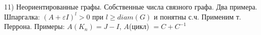 11) Неориентированные графы. Собственные числа связного графа. Два примера.\\
Шпаргалка: $(A + \varepsilon I)^l > 0$ при $l \ge diam(G)$ и понятны с.ч. Применим т. Перрона. Примеры: $A(K_n) = J-I$, $A$(цикл) $=C + C^{-1}$\\
